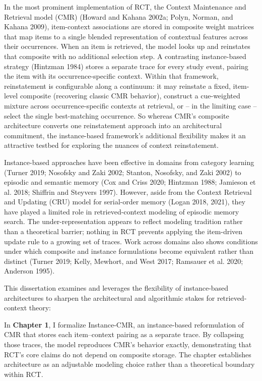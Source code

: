 \documentclass[
  letterpaper,
  11pt,
  english,
  singlespacing,
  headsepline]{MastersDoctoralThesis}
\begin{document}
In the most prominent implementation of RCT, the Context Maintenance and
Retrieval model (CMR) (Howard and Kahana 2002a; Polyn, Norman, and
Kahana 2009), item-context associations are stored in composite weight
matrices that map items to a single blended representation of contextual
features across their occurrences. When an item is retrieved, the model
looks up and reinstates that composite with no additional selection
step. A contrasting instance-based strategy (Hintzman 1984) stores a
separate trace for every study event, pairing the item with its
occurrence-specific context. Within that framework, reinstatement is
configurable along a continuum: it may reinstate a fixed, item-level
composite (recovering classic CMR behavior), construct a cue-weighted
mixture across occurrence-specific contexts at retrieval, or -- in the
limiting case -- select the single best-matching occurrence. So whereas
CMR's composite architecture converts one reinstatement approach into an
architectural commitment, the instance-based framework's additional
flexibility makes it an attractive testbed for exploring the nuances of
context reinstatement.

Instance-based approaches have been effective in domains from category
learning (Turner 2019; Nosofsky and Zaki 2002; Stanton, Nosofsky, and
Zaki 2002) to episodic and semantic memory (Cox and Criss 2020; Hintzman
1988; Jamieson et al. 2018; Shiffrin and Steyvers 1997). However, aside
from the Context Retrieval and Updating (CRU) model for serial-order
memory (Logan 2018, 2021), they have played a limited role in
retrieved-context modeling of episodic memory search. The
under-representation appears to reflect modeling tradition rather than a
theoretical barrier; nothing in RCT prevents applying the item-driven
update rule to a growing set of traces. Work across domains also shows
conditions under which composite and instance formulations become
equivalent rather than distinct (Turner 2019; Kelly, Mewhort, and West
2017; Ramsauer et al. 2020; Anderson 1995).

This dissertation examines and leverages the flexibility of
instance-based architectures to sharpen the architectural and
algorithmic stakes for retrieved-context theory:

In \textbf{Chapter 1}, I formalize Instance-CMR, an instance-based
reformulation of CMR that stores each item--context pairing as a
separate trace. By collapsing those traces, the model reproduces CMR's
behavior exactly, demonstrating that RCT's core claims do not depend on
composite storage. The chapter establishes architecture as an adjustable
modeling choice rather than a theoretical boundary within RCT.
\end{document}
